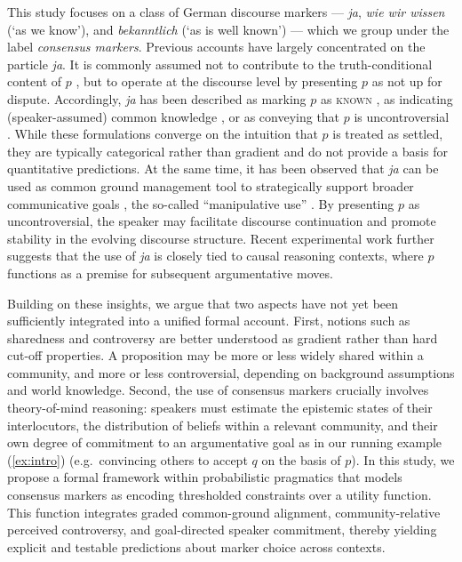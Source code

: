 \documentclass[12pt]{article}
\begin{document}
This study focuses on a class of German discourse markers — \textit{ja}, \textit{wie wir wissen} (‘as we know’), and \textit{bekanntlich} (‘as is well known’) — which we group under the label \emph{consensus markers}. Previous accounts have largely concentrated on the particle \textit{ja}. It is commonly assumed not to contribute to the truth-conditional content of $p$ \citep{gutzmann2015use,grosz2021discourse}, but to operate at the discourse level by presenting $p$ as not up for dispute. Accordingly, \textit{ja} has been described as marking $p$ as \textsc{known} \citep{thurmair1989modalpartikeln}, as indicating (speaker-assumed) common knowledge \citep{karagjosova2004meaning}, or as conveying that $p$ is uncontroversial \citep{jacobs_semantics_1991,zimmermann2011discourse,waltereit2001modal}. While these formulations converge on the intuition that $p$ is treated as settled, they are typically categorical rather than gradient and do not provide a basis for quantitative predictions. At the same time, it has been observed that \textit{ja} can be used as common ground management tool to strategically support broader communicative goals \citep{repp2013common}, the so-called ``manipulative use'' \citep{doring2016modal}. By presenting $p$ as uncontroversial, the speaker may facilitate discourse continuation and promote stability in the evolving discourse structure. Recent experimental work \citep{seemann2025} further suggests that the use of \textit{ja} is closely tied to causal reasoning contexts, where $p$ functions as a premise for subsequent argumentative moves.

Building on these insights, we argue that two aspects have not yet been sufficiently integrated into a unified formal account. First, notions such as sharedness and controversy are better understood as gradient rather than hard cut-off properties. A proposition may be more or less widely shared within a community, and more or less controversial, depending on background assumptions and world knowledge. Second, the use of consensus markers crucially involves theory-of-mind reasoning: speakers must estimate the epistemic states of their interlocutors, the distribution of beliefs within a relevant community, and their own degree of commitment to an argumentative goal as in our running example (\ref{ex:intro}) (e.g.\ convincing others to accept $q$ on the basis of $p$). In this study, we propose a formal framework within probabilistic pragmatics \citep{goodman2016pragmatic,degen2023rational,franke2016probabilistic} that models consensus markers as encoding thresholded constraints over a utility function. This function integrates graded common-ground alignment, community-relative perceived controversy, and goal-directed speaker commitment, thereby yielding explicit and testable predictions about marker choice across contexts.
\end{document}

